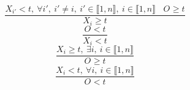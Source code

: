 $$\frac{X_{i'}<t,~\forall i',~i' \neq i,~i' \in \llbracket1,n\rrbracket,~i \in \llbracket1,n\rrbracket~~~~O_{} \geq t}{X_{i} \geq t}$$ $$\frac{O_{}<t}{X_{i}<t}$$ $$\frac{X_{i} \geq t,~\exists i,~i \in \llbracket1,n\rrbracket}{O_{} \geq t}$$ $$\frac{X_{i}<t,~\forall i,~i \in \llbracket1,n\rrbracket}{O_{}<t}$$ 
